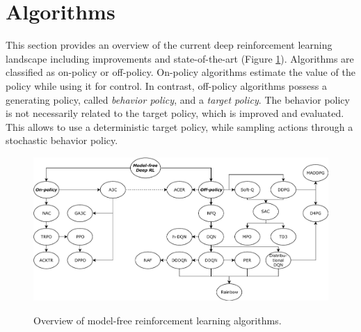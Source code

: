     \section{Algorithms \label{sec:algorithms}}
	This section provides an overview of the current deep reinforcement learning landscape including improvements and state-of-the-art (Figure \ref{fig:overview}). 
	Algorithms are classified as on-policy or off-policy.
	On-policy algorithms estimate the value of the policy while using it for control.
	In contrast, off-policy algorithms possess a generating policy, called \textit{behavior policy}, and a \textit{target policy}.
	The behavior policy is not necessarily related to the target policy, which is improved and evaluated.
	This allows to use a deterministic target policy, while sampling actions through a stochastic behavior policy. \cite[chapter 5]{Sutton2018}
	\begin{figure}[!t]
		\centering
		\includegraphics[angle=90, height=.75\textheight]{images/tree2.pdf}
		\label{fig:overview}
		\caption{Overview of model-free reinforcement learning algorithms.}
	\end{figure}
		
